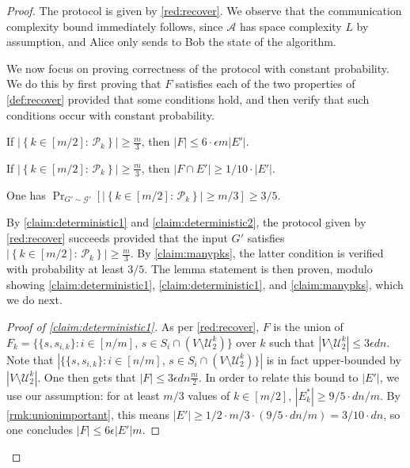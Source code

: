 \begin{proof}
	The protocol is given by \cref{red:recover}.  We observe that the communication complexity bound immediately follows, since $\mathcal{A}$ has space complexity $L$ by assumption, and Alice only sends to Bob the state of the algorithm.
	
	We now focus on proving correctness of the protocol with constant probability. We do this by first proving that $F$ satisfies each of the two properties of \cref{def:recover} provided that some conditions hold, and then verify that such conditions occur with constant probability.
	
	\begin{claim}
		\label{claim:deterministic1}
		If $\left|\left\{k \in [m/2]: \, \mathcal{P}_k\right\} \right| \ge\frac{m}{3}$, then $|F| \le 6 \cdot \epsilon m |E'| $.
	\end{claim}

	\begin{claim}
		\label{claim:deterministic2}
		If $\left|\left\{k \in [m/2]: \, \mathcal{P}_k\right\} \right| \ge\frac{m}{3}$, then $|F \cap E'| \ge 1/10 \cdot |E'|$.
	\end{claim}
	
	\begin{claim}
		\label{claim:manypks}
		One has $
			\Pr_{G' \sim \mathcal{G}'}\left[\left|\left\{k \in [m/2]: \, \mathcal{P}_k\right\} \right| \ge {m}/{3}\right] \ge {3}/{5}$.
	\end{claim}
	\noindent
	By \cref{claim:deterministic1} and \cref{claim:deterministic2}, the protocol given by \cref{red:recover} succeeds provided that the input $G'$ satisfies $\left|\left\{k \in [m/2]: \, \mathcal{P}_k\right\} \right| \ge\frac{m}{3}$. By \cref{claim:manypks}, the latter condition is verified with probability at least $3/5$. The lemma statement is then proven, modulo showing \cref{claim:deterministic1}, \cref{claim:deterministic1}, and \cref{claim:manypks}, which we do next.
	
		\begin{proof}[Proof of \cref{claim:deterministic1}]
		As per \cref{red:recover}, $F$ is the union of $F_k=\{ \{s,s_{i,k}\} : i \in [n/m],\, s \in S_i \cap (V \setminus \mathcal{U}_2^k) \}$ over $k$ such that $|V \setminus \mathcal{U}_2^k| \le 3\epsilon dn$. Note that $|\{ \{s,s_{i,k}\} : i \in [n/m],\, s \in S_i \cap (V \setminus \mathcal{U}_2^k) \}|$ is in fact upper-bounded by $|V \setminus \mathcal{U}_2^k|$. One then gets that $|F| \le 3\epsilon dn \frac{m}{2}$. In order to relate this bound to $|E'|$, we use our assumption: for at least $m/3$ values of $k \in [m/2]$, $|E^*_k| \ge 9/5 \cdot dn/m$. By \cref{rmk:unionimportant}, this means $|E'| \ge 1/2 \cdot m/3 \cdot (9/5 \cdot dn/m) = 3/10 \cdot dn$, so one concludes $|F| \le 6 \epsilon |E'| m$.
	\end{proof}
	

\end{proof}
